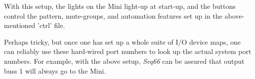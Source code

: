    With this setup, the lights on the Mini light-up at start-up, and the
   buttons control the pattern, mute-groups, and automation features set up in
   the above-mentioned 'ctrl' file.

   Perhaps tricky, but once one has set up a whole suite of I/O device maps,
   one can reliably use these hard-wired port numbers to look up the actual
   system port numbers.  For example, with the above setup, \textsl{Seq66} can
   be assured that output buss 1 will always go to the Mini.

